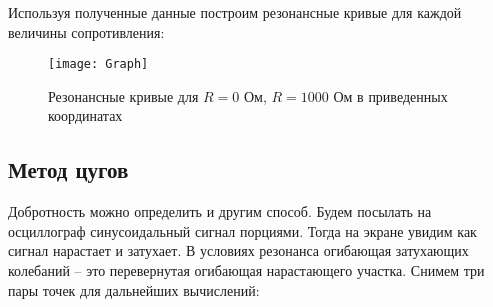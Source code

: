 \documentclass{lab}
\begin{document}
\begin{table}[H]
\centering
\renewcommand{\arraystretch}{1.3}
\renewcommand{\arraystretch}{1}
\caption{\footnotesize Полученные значения при R = 100 Ом}
\label{tab2}
\end{table}

Используя полученные данные построим резонансные кривые для каждой величины сопротивления:

\begin{figure}[H]
	\centering
	\texttt{[image: Graph]}
	\caption{\footnotesize Резонансные кривые для $R = 0$ Ом, $R = 1000$ Ом в приведенных координатах}
\end{figure}

\newpage

\subsection*{Метод цугов}

Добротность можно определить и другим способ. Будем посылать на осциллограф синусоидальный сигнал порциями. Тогда на экране увидим как сигнал нарастает и затухает. В условиях резонанса огибающая затухающих колебаний -- это перевернутая огибающая нарастающего участка.
Снимем три пары точек для дальнейших вычислений:
\end{document}
